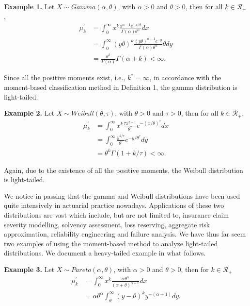 \documentclass[]{book}
\theoremstyle{definition}
\theoremstyle{definition}
\theoremstyle{definition}
\theoremstyle{remark}
\begin{document}
\textbf{Example 1.} Let \(X\sim Gamma(\alpha,\theta)\), with
\(\alpha>0\) and \(\theta>0\), then for all \(k\in \mathcal{R}_+\),
\[\begin{aligned}
    \mu_k^{'} &= \int_0^{\infty} x^k \frac{x^{\alpha-1} e^{-x/\theta}}{\Gamma(\alpha) \theta^{\alpha}} dx \\
    &= \int_0^{\infty} (y\theta)^k  \frac{(y\theta)^{\alpha-1} e^{-y}}{\Gamma(\alpha) \theta^{\alpha}} \theta dy \\
    &= \frac{\theta^k}{\Gamma(\alpha)} \Gamma(\alpha+k) < \infty.\end{aligned}\]

Since all the positive moments exist, i.e., \(k^{\ast}=\infty\), in
accordance with the moment-based classification method in Definition 1,
the gamma distribution is light-tailed.

\textbf{Example 2.} Let \(X\sim Weibull(\theta,\tau)\), with
\(\theta>0\) and \(\tau>0\), then for all \(k\in \mathcal{R}_+\),
\[\begin{aligned}
    \mu_k^{'} &= \int_0^{\infty} x^k \frac{\tau x^{\tau-1} }{\theta^{\tau}} e^{-(x/\theta)^{\tau}}dx \\
    &= \int_0^{\infty}  \frac{ y^{k/\tau} }{\theta^{\tau}} e^{-y/\theta^{\tau}}dy \\
    &= \theta^{k} \Gamma(1+k/\tau) < \infty.\end{aligned}\]

Again, due to the existence of all the positive moments, the Weibull
distribution is light-tailed.

We notice in passing that the gamma and Weibull distributions have been
used quite intensively in actuarial practice nowadays. Applications of
these two distributions are vast which include, but are not limited to,
insurance claim severity modelling, solvency assessment, loss reserving,
aggregate risk approximation, reliability engineering and failure
analysis. We have thus far seem two examples of using the moment-based
method to analyze light-tailed distributions. We document a heavy-tailed
example in what follows.

\textbf{Example 3.} Let \(X\sim Pareto(\alpha,\theta)\), with
\(\alpha>0\) and \(\theta>0\), then for \(k\in \mathcal{R}_+\)
\[\begin{aligned}
    \mu_k^{'} &= \int_0^{\infty} x^k \frac{\alpha \theta^{\alpha}}{(x+\theta)^{\alpha+1}} dx \\
    &= \alpha \theta^{\alpha} \int_{\theta}^{\infty} (y-\theta)^k {y^{-(\alpha+1)}} dy.\end{aligned}\]
\end{document}
